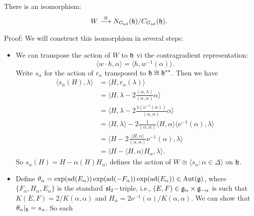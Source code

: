 \begin{dang}
    \begin{lemma}
        There is an isomorphism: 
\begin{equation}
     W \overset{\cong}{\longrightarrow} N_{G_{\text{ad}}}(\mathfrak{h})/C_{G_{\text{ad}}}(\mathfrak{h}).
\end{equation}
    \end{lemma}
\end{dang}
Proof: We will construct this isomorphism in several steps:
\begin{itemize}
    \item We can transpose the action of $W$ to $\mathfrak{h}$ vi the contragradient representation:
    \begin{equation}
        \langle w\cdot h, \alpha\rangle = \langle h,w^{-1}(\alpha)\rangle.
    \end{equation}
    Write $s_\alpha$ for the action of $r_\alpha$ transposed to $\mathfrak{h}\cong\mathfrak{h}^{**}$. Then we have 
    \begin{equation}
        \begin{split}
           \langle s_\alpha(H),\lambda \rangle&= \langle H,r_\alpha(\lambda)\rangle\\
            &=\langle H, \lambda -2\frac{(\alpha,\lambda)}{(\alpha,\alpha)}\alpha\rangle\\
            &=\langle H, \lambda-2\frac{\lambda(\nu^{-1}(\alpha))}{(\alpha,\alpha)}\alpha\rangle\\
            &=\langle H,\lambda\rangle -2\frac{1}{(\alpha,\alpha)}\langle H,\alpha\rangle
            \langle \nu^{-1}(\alpha),\lambda \rangle\\
            &=\langle H-2\frac{\langle H,\alpha\rangle}{(\alpha,\alpha)}\nu^{-1}(\alpha),\lambda\rangle\\
            &=\langle H-\langle H,\alpha\rangle H_\alpha,\lambda\rangle.
        \end{split}
    \end{equation}
    So $s_\alpha(H)=H-\alpha(H)H_\alpha$, defines the action of $W\cong\langle s_\alpha:\alpha\in\Delta\rangle$ on
    $\mathfrak{h}$.
    \item Define $\theta_\alpha = \exp(\text{ad}(E_\alpha))\exp(\text{ad}(-F_\alpha))\exp(\text{ad}(E_\alpha))\in\text{Aut}(\mathfrak{g})$, where 
    $\{F_\alpha,H_\alpha, E_\alpha\}$ is the standard $\mathfrak{sl}_2-$triple, i.e., $(E,F)\in\mathfrak{g}_\alpha\times\mathfrak{g}_{-\alpha}$ is 
    such that $K(E,F)=2/K(\alpha,\alpha)$ and $H_\alpha = 2\nu^{-1}(\alpha)/K(\alpha,\alpha)$. 
    We can show that $\theta_\alpha|_{\mathfrak{h}}=s_\alpha$. So each 

\end{itemize}
